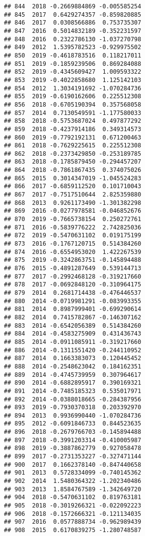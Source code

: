 \documentclass[
]{article}
\begin{document}
\begin{verbatim}
## 844  2018 -0.2669884869 -0.005585254
## 845  2017  0.6429274357 -0.859820885
## 846  2017  0.0308566886  0.753735307
## 847  2016  0.5014832189 -0.352231597
## 848  2016  0.2322786130 -1.037270798
## 849  2012  1.5395782523 -0.929975502
## 850  2019 -0.4618783516  0.118217011
## 851  2019 -0.1859239506  0.869284088
## 852  2019 -0.4345609427  1.009593322
## 853  2019 -0.4022858680  1.125142103
## 854  2012  1.3034191692 -1.070284736
## 855  2019 -0.6190162606  0.225512308
## 856  2018 -0.6705190394  0.357568058
## 857  2014  0.7130549591 -1.177580033
## 858  2018 -0.5753687024  0.497877292
## 859  2018 -0.4237914186  0.349314573
## 860  2019 -0.7792192131  0.671200463
## 861  2018 -0.7629225615  0.225512308
## 862  2018 -0.2373429850 -0.253189785
## 863  2018 -0.1785879450 -0.294457207
## 864  2018 -0.7861867435  0.374075026
## 865  2015  0.3014347019 -1.045524283
## 866  2017 -0.6859112520  0.101710043
## 867  2017 -0.7517510644  2.825359880
## 868  2013  0.9261173490 -1.301382298
## 869  2016 -0.0277978581 -0.046852676
## 870  2019 -0.7665738154  0.250272761
## 871  2016 -0.5839776222  2.742825036
## 872  2019 -0.5470631102  0.019175199
## 873  2016 -0.1767120715  0.514384260
## 874  2016 -0.6554953020  1.422267539
## 875  2019 -0.3242863751 -0.145894488
## 876  2015 -0.4891287649  0.539144713
## 877  2017 -0.2992468128 -0.319217660
## 878  2017 -0.0692848120 -0.310964175
## 879  2014  0.2681714438 -0.476446537
## 880  2014 -0.0719981291 -0.083993355
## 881  2014  0.8987999401 -0.699290614
## 882  2014  0.7415782867 -0.146307162
## 883  2014 -0.6542056389  0.514384260
## 884  2014 -0.4583275909  0.431436743
## 885  2014 -0.0911085911 -0.319217660
## 886  2014 -0.1311551420 -0.244110952
## 887  2014  0.1663383073  0.120445452
## 888  2014 -0.2548623042  0.184162351
## 889  2014 -0.4745739959  0.307964617
## 890  2014 -0.6882895917  0.390169321
## 891  2014 -0.7485185323  0.535017971
## 892  2014 -0.0388018665 -0.284387956
## 893  2019 -0.7930370318  0.203392970
## 894  2013  0.9936990440 -1.070284736
## 895  2012 -0.6091846733  0.844523635
## 896  2018 -0.2679766703 -0.145894488
## 897  2018 -0.3991203314 -0.410005987
## 898  2019 -0.3887862779  0.927058478
## 899  2017 -0.2731353227 -0.327471144
## 900  2017  0.1662378140 -0.847440658
## 901  2013  0.5728334099 -0.740145362
## 902  2014  1.5480364322 -1.202340486
## 903  2013  1.8584767589 -1.342649720
## 904  2018 -0.5470631102  0.819763181
## 905  2018 -0.3019266321 -0.022092223
## 906  2018 -0.1572666321 -0.121134035
## 907  2016  0.0577888734 -0.962989439
## 908  2015  0.6170839275 -1.280748587

\end{verbatim}
\end{document}
